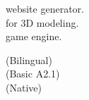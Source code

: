 \documentclass[%
              doublesided,
              paper=a4,
              fontsize=10pt
              ]{my-resume}
\begin{document}
{    \vspace{0.5em}
     website generator.\\
     for 3D modeling.\\
     game engine.
    
    \vspace{0.5em}
     (Bilingual)\\
     (Basic A2.1)\\
     (Native)
    

}
\end{document}
